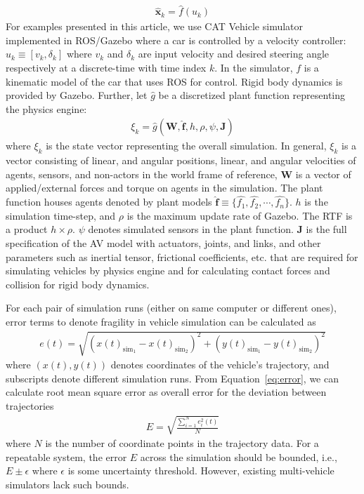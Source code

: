 \documentclass[aps,pra,twocolumn,notitlepage,nofootinbib,superscriptaddress]{revtex4-1}
\newcommand{\spliteq}[1]{\begin{equation}\begin{split}#1\end{split}\end{equation}}
\def\fbf{{\mathbf f}}
\def\xbf{{\mathbf x}}
\def\Jbf{{\mathbf J}}
\def\Wbf{{\mathbf W}}
\begin{document}
\spliteq{
\label{eq:carplant_discrte}
\hat{\xbf}_k = \hat{f}(u_k)
}
For examples presented in this article, we use CAT Vehicle simulator~\cite{bhadani2018cat} implemented in ROS/Gazebo where a car is controlled by a velocity controller: $u_k \equiv [v_k, \delta_k]$ where $v_k$ and $\delta_k$ are input velocity and desired steering angle respectively at a discrete-time with time index $k$. In the simulator, $f$ is a kinematic model of the car that uses ROS for control. Rigid body dynamics is provided by Gazebo.
Further, let $\hat{g}$ be a discretized  plant function representing the physics engine:
\spliteq{
\label{eq:gazebo_plant}
\xi_k = \hat{g}( \Wbf, \hat{\fbf}, h, \rho, \psi, \Jbf) 
}
where $\xi_k$ is the state vector representing the overall simulation. In general, $\xi_k$ is a vector consisting of linear, and angular positions, linear, and angular velocities of agents, sensors, and non-actors in the world frame of reference, $\Wbf$ is a vector of applied/external forces and torque on agents in the simulation. The plant function houses agents denoted by plant models $\hat{\fbf} \equiv \{ \hat{f_1},\hat{f_2},\cdots, \hat{f_n}\}$. $h$ is the simulation time-step, and $\rho$ is the maximum update rate of Gazebo. The RTF is a product $h \times \rho$. $\psi$ denotes simulated sensors in the plant function. $\Jbf$ is the full specification of the AV model with actuators, joints, and links, and other parameters such as inertial tensor, frictional coefficients, etc. that are required for simulating vehicles by physics engine and for calculating contact forces and collision for rigid body dynamics. 

For each pair of simulation runs (either on same computer or different ones), error terms to denote fragility in vehicle simulation can be calculated as 
\spliteq{
\label{eq:error}
e(t) = \sqrt{(x(t)_{\text{sim}_1} - x(t)_{\text{sim}_2})^2 + (y(t)_{\text{sim}_1} - y(t)_{\text{sim}_2})^2}
}
where $(x(t), y(t))$ denotes coordinates of the vehicle's trajectory, and subscripts denote different simulation runs.
From Equation~\eqref{eq:error}, we can calculate root mean square error as overall error for the deviation between trajectories 
\spliteq{
\label{eq:RMS}
E = \sqrt{\frac{\sum_{i = 1}^N e_i^2(t)}{N}}
}
where $N$ is the number of coordinate points in the trajectory data.
For a repeatable system, the error $E$ across the simulation should be bounded, i.e.,  $ E \pm \epsilon$ where $\epsilon$ is some uncertainty threshold. However, existing multi-vehicle simulators lack such bounds. 
\end{document}
